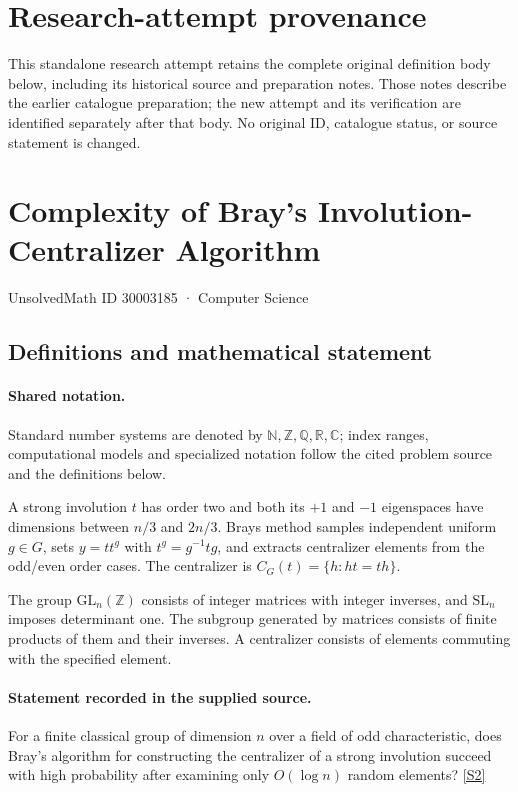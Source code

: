 \documentclass[11pt]{article}
\begin{document}
\section*{Research-attempt provenance}
This standalone research attempt retains the complete original definition body below,
including its historical source and preparation notes. Those notes describe the
earlier catalogue preparation; the new attempt and its verification are identified
separately after that body. No original ID, catalogue status, or source statement is changed.

\section{Complexity of Bray’s Involution-Centralizer Algorithm}\label{30003185}
{\small UnsolvedMath ID 30003185 · Computer Science}
\subsection{Definitions and mathematical statement}

\paragraph{Shared notation.}Standard number systems are denoted by $\mathbb N,\mathbb Z,\mathbb Q,\mathbb R,\mathbb C$; index ranges, computational models and specialized notation follow the cited problem source and the definitions below.


A strong involution $t$ has order two and both its $+1$ and $-1$ eigenspaces have dimensions between $n/3$ and $2n/3$. Bray\textquotesingle s method samples independent uniform $g\in G$, sets $y=tt^g$ with $t^g=g^{-1}tg$, and extracts centralizer elements from the odd/even order cases. The centralizer is $C_G(t)=\{h:ht=th\}$.

The group $\mathrm{GL}_n(\mathbb Z)$ consists of integer matrices with integer inverses, and $\mathrm{SL}_n$ imposes determinant one. The subgroup generated by matrices consists of finite products of them and their inverses. A centralizer consists of elements commuting with the specified element.
\paragraph{Statement recorded in the supplied source.}
For a finite classical group of dimension $n$ over a field of odd characteristic, does Bray's algorithm for constructing the centralizer of a strong involution succeed with high probability after examining only $O(\log n)$ random elements? \href{https://doi.org/10.4171/owr/2016/37}{[S2]}
\end{document}
